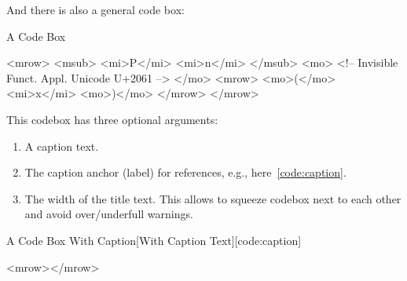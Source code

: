 \documentclass[11pt,a4paper]{book}
\begin{document}
And there is also a general code box:
\begin{codebox}{A Code Box}
\begin{code}[MathML]
<mrow>
  <msub>
    <mi>P</mi>
    <mi>n</mi>
  </msub>
  <mo>
    <!-- Invisible 
    Funct. Appl. 
    Unicode U+2061 -->  
  </mo>
  <mrow>
    <mo>(</mo>
    <mi>x</mi>
    <mo>)</mo>
  </mrow>
</mrow>
\end{code}
\end{codebox}

This codebox has three optional arguments:
\begin{enumerate}
\item A caption text.
\item The caption anchor (label) for references, e.g., here~\ref{code:caption}.
\item The width of the title text. This allows to squeeze codebox next to each other and avoid over/underfull warnings.
\end{enumerate}

\begin{codebox}{A Code Box With Caption}[With Caption Text][code:caption]
\begin{code}[MathML]
<mrow></mrow>
\end{code}
\end{codebox}
\end{document}
